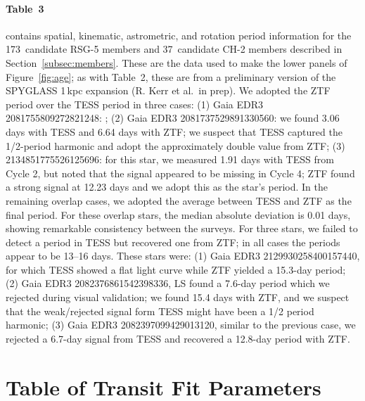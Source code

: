 \documentclass[12pt,twocolumn,tighten,linenumbers]{aastex63}
\newcommand{\nchtwo}{37} %
\newcommand{\nrsgfive}{173} %
\begin{document}
\paragraph{Table~3} contains spatial, kinematic, astrometric, and
rotation period information for the \nrsgfive\ candidate RSG-5 members
and \nchtwo\ candidate CH-2 members described in
Section~\ref{subsec:members}.  These are the data used to make the
lower panels of Figure~\ref{fig:age}; as with Table~2, these are
from a preliminary version of the SPYGLASS 1\,kpc expansion (R. Kerr et
al.\ in prep). 
We adopted the ZTF period over the
TESS period in three cases: (1) Gaia EDR3 2081755809272821248: ; (2) Gaia EDR3 2081737529891330560: we found 3.06
days with TESS and 6.64 days with ZTF; we suspect that TESS captured
the 1/2-period harmonic and adopt the approximately double value from
ZTF; (3) 2134851775526125696: for this star, we measured 1.91 days
with TESS from Cycle 2, but noted that the signal appeared to be
missing in Cycle 4; ZTF found a strong signal at 12.23 days and we
adopt this as the star's period. In the remaining overlap cases, we
adopted the average between TESS and ZTF as the final period. For
these overlap stars, the median absolute deviation is 0.01 days,
showing remarkable consistency between the surveys. For three stars,
we failed to detect a period in TESS but recovered one from ZTF; in
all cases the periods appear to be 13--16 days.  These stars were: (1)
Gaia EDR3 2129930258400157440, for which TESS showed a flat light
curve while ZTF yielded a 15.3-day period; (2) Gaia EDR3
2082376861542398336, LS found a 7.6-day period which we rejected
during visual validation; we found 15.4 days with ZTF, and we suspect
that the weak/rejected signal form TESS might have been a 1/2 period
harmonic; (3) Gaia EDR3 2082397099429013120, similar to the previous
case, we rejected a 6.7-day signal from TESS and recovered a 12.8-day
period with ZTF. 


\section{Table of Transit Fit Parameters}
\label{app:transit}
\end{document}
